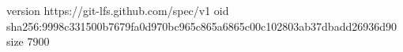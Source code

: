 version https://git-lfs.github.com/spec/v1
oid sha256:9998c331500b7679fa0d970bc965c865a6865c00c102803ab37dbadd26936d90
size 7900
